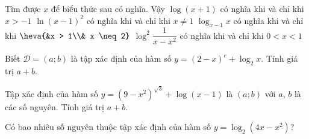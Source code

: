 \begin{ex}%
  Tìm được $x$ để biểu thức sau có nghĩa. Vậy
  \choiceTF
  {\True $\log (x+1)$ có  nghĩa khi và chỉ khi $x >-1$}
  {\True $\ln (x-1)^2$ có nghĩa khi và chỉ khi $x \neq  1$}
  {\True$\log _{x-1} x$ có nghĩa khi và chỉ khi $\heva{&x >  1\\& x \neq 2}$}
  {\True$\log ^2\dfrac{1}{x-x^2}$  có nghĩa khi và chỉ khi $0< x < 1$}
\end{ex}



\begin{ex}%
	 Biết $\mathscr{D}=(a;b)$ là tập xác định của hàm số $y=(2-x)^{e}+\log_2 x$. Tính giá trị $a+b$.
\end{ex}

\begin{ex}%
	Tập xác định của hàm số $y = (9-x^2)^{\sqrt{3}} + \log (x-1)$ là  $(a;b)$ với $a$, $b$ là các số nguyên. Tính giá trị $a+b$.
\end{ex}

\begin{ex}%
	 Có bao nhiêu số nguyên thuộc tập xác định của hàm số $y=\log_2\left(4x-x^2\right)$?
\end{ex}

